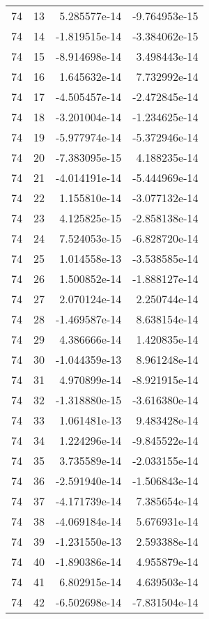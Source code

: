 \begin{tabular}{rrrr}
  74 &   13 &  5.285577e-14 & -9.764953e-15 \\
  74 &   14 & -1.819515e-14 & -3.384062e-15 \\
  74 &   15 & -8.914698e-14 &  3.498443e-14 \\
  74 &   16 &  1.645632e-14 &  7.732992e-14 \\
  74 &   17 & -4.505457e-14 & -2.472845e-14 \\
  74 &   18 & -3.201004e-14 & -1.234625e-14 \\
  74 &   19 & -5.977974e-14 & -5.372946e-14 \\
  74 &   20 & -7.383095e-15 &  4.188235e-14 \\
  74 &   21 & -4.014191e-14 & -5.444969e-14 \\
  74 &   22 &  1.155810e-14 & -3.077132e-14 \\
  74 &   23 &  4.125825e-15 & -2.858138e-14 \\
  74 &   24 &  7.524053e-15 & -6.828720e-14 \\
  74 &   25 &  1.014558e-13 & -3.538585e-14 \\
  74 &   26 &  1.500852e-14 & -1.888127e-14 \\
  74 &   27 &  2.070124e-14 &  2.250744e-14 \\
  74 &   28 & -1.469587e-14 &  8.638154e-14 \\
  74 &   29 &  4.386666e-14 &  1.420835e-14 \\
  74 &   30 & -1.044359e-13 &  8.961248e-14 \\
  74 &   31 &  4.970899e-14 & -8.921915e-14 \\
  74 &   32 & -1.318880e-15 & -3.616380e-14 \\
  74 &   33 &  1.061481e-13 &  9.483428e-14 \\
  74 &   34 &  1.224296e-14 & -9.845522e-14 \\
  74 &   35 &  3.735589e-14 & -2.033155e-14 \\
  74 &   36 & -2.591940e-14 & -1.506843e-14 \\
  74 &   37 & -4.171739e-14 &  7.385654e-14 \\
  74 &   38 & -4.069184e-14 &  5.676931e-14 \\
  74 &   39 & -1.231550e-13 &  2.593388e-14 \\
  74 &   40 & -1.890386e-14 &  4.955879e-14 \\
  74 &   41 &  6.802915e-14 &  4.639503e-14 \\
  74 &   42 & -6.502698e-14 & -7.831504e-14 \\

\end{tabular}
